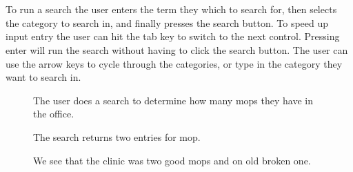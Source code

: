 \documentclass[12pt]{report}
\begin{document}
\chapter*{}

To run a search the user enters the term they which to search for, then 
selects the category to search in, and finally presses the search button.
To speed up input entry the user can hit the tab key to switch to the
next control.  Pressing enter will run the search without having to click
the search button.  The user can use the arrow keys to cycle through the
categories, or type in the category they want to search in.

\begin{figure}[h!]
\caption{The user does a search to determine how many mops they have in the
office.}
\end{figure}

\begin{figure}[h!]
\caption{The search returns two entries for mop.}
\end{figure}

\begin{figure}[h!]
\caption{We see that the clinic was two good mops and on old broken one.}
\end{figure}
\end{document}

